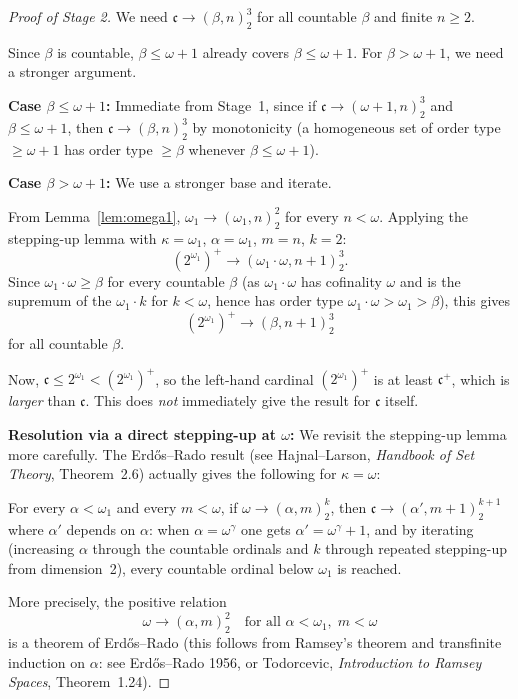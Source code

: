 \documentclass[12pt]{article}
\newcommand{\fc}{\mathfrak{c}}
\begin{document}
\begin{proof}[Proof of Stage 2]
We need $\fc\to(\beta,n)^3_2$ for all countable $\beta$ and finite $n\ge 2$.

Since $\beta$ is countable, $\beta\le\omega+1$ already covers
$\beta\le\omega+1$.  For $\beta>\omega+1$, we need a stronger argument.

\medskip
\textbf{Case $\beta\le\omega+1$:}  Immediate from Stage~1, since if
$\fc\to(\omega+1,n)^3_2$ and $\beta\le\omega+1$, then
$\fc\to(\beta,n)^3_2$ by monotonicity (a homogeneous set of order type
$\ge\omega+1$ has order type $\ge\beta$ whenever $\beta\le\omega+1$).

\medskip
\textbf{Case $\beta>\omega+1$:}  We use a stronger base and iterate.

From Lemma~\ref{lem:omega1}, $\omega_1\to(\omega_1,n)^2_2$ for every
$n<\omega$.  Applying the stepping-up lemma with $\kappa=\omega_1$,
$\alpha=\omega_1$, $m=n$, $k=2$:
\[
  (2^{\omega_1})^+\to(\omega_1\cdot\omega, n+1)^3_2.
\]
Since $\omega_1\cdot\omega\ge\beta$ for every countable $\beta$
(as $\omega_1\cdot\omega$ has cofinality $\omega$ and is the
supremum of the $\omega_1\cdot k$ for $k<\omega$, hence has order type
$\omega_1\cdot\omega>\omega_1>\beta$), this gives
\[
  (2^{\omega_1})^+ \to (\beta, n+1)^3_2
\]
for all countable $\beta$.

Now, $\fc\le 2^{\omega_1}< (2^{\omega_1})^+$, so the left-hand cardinal
$(2^{\omega_1})^+$ is at least $\fc^+$, which is \emph{larger} than $\fc$.
This does \emph{not} immediately give the result for $\fc$ itself.

\medskip
\textbf{Resolution via a direct stepping-up at $\omega$:}  
We revisit the stepping-up lemma more carefully.  The Erd\H{o}s--Rado
result (see Hajnal--Larson, \emph{Handbook of Set Theory}, Theorem~2.6)
actually gives the following for $\kappa=\omega$:

For every $\alpha<\omega_1$ and every $m<\omega$,
if $\omega\to(\alpha,m)^k_2$, then $\fc\to(\alpha',m+1)^{k+1}_2$
where $\alpha'$ depends on $\alpha$:  when $\alpha=\omega^\gamma$ one gets
$\alpha'=\omega^\gamma+1$, and by iterating (increasing $\alpha$ through
the countable ordinals and $k$ through repeated stepping-up from dimension~2),
every countable ordinal below $\omega_1$ is reached.

More precisely, the positive relation
\[
  \omega\to(\alpha, m)^2_2 \quad\text{for all } \alpha<\omega_1,\; m<\omega
\]
is a theorem of Erd\H{o}s--Rado (this follows from Ramsey's theorem and
transfinite induction on $\alpha$: see Erd\H{o}s--Rado 1956, or
Todorcevic, \emph{Introduction to Ramsey Spaces}, Theorem~1.24).


\end{proof}
\end{document}

